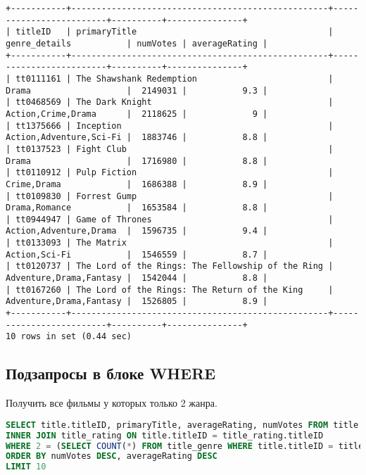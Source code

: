 \documentclass[12pt,a4paper]{article}
\begin{document}
\begin{lstlisting}[basicstyle = \tiny\ttfamily, columns = fixed]
+-----------+---------------------------------------------------+-------------------------+----------+---------------+
| titleID   | primaryTitle                                      | genre_details           | numVotes | averageRating |
+-----------+---------------------------------------------------+-------------------------+----------+---------------+
| tt0111161 | The Shawshank Redemption                          | Drama                   |  2149031 |           9.3 |
| tt0468569 | The Dark Knight                                   | Action,Crime,Drama      |  2118625 |             9 |
| tt1375666 | Inception                                         | Action,Adventure,Sci-Fi |  1883746 |           8.8 |
| tt0137523 | Fight Club                                        | Drama                   |  1716980 |           8.8 |
| tt0110912 | Pulp Fiction                                      | Crime,Drama             |  1686388 |           8.9 |
| tt0109830 | Forrest Gump                                      | Drama,Romance           |  1653584 |           8.8 |
| tt0944947 | Game of Thrones                                   | Action,Adventure,Drama  |  1596735 |           9.4 |
| tt0133093 | The Matrix                                        | Action,Sci-Fi           |  1546559 |           8.7 |
| tt0120737 | The Lord of the Rings: The Fellowship of the Ring | Adventure,Drama,Fantasy |  1542044 |           8.8 |
| tt0167260 | The Lord of the Rings: The Return of the King     | Adventure,Drama,Fantasy |  1526805 |           8.9 |
+-----------+---------------------------------------------------+-------------------------+----------+---------------+
10 rows in set (0.44 sec)
\end{lstlisting}

\subsection{Подзапросы в блоке WHERE}

Получить все фильмы у которых только 2 жанра.

\begin{lstlisting}[language=SQL]
SELECT title.titleID, primaryTitle, averageRating, numVotes FROM title
INNER JOIN title_rating ON title.titleID = title_rating.titleID
WHERE 2 = (SELECT COUNT(*) FROM title_genre WHERE title.titleID = title_genre.titleID)
ORDER BY numVotes DESC, averageRating DESC
LIMIT 10
\end{lstlisting}
\end{document}
